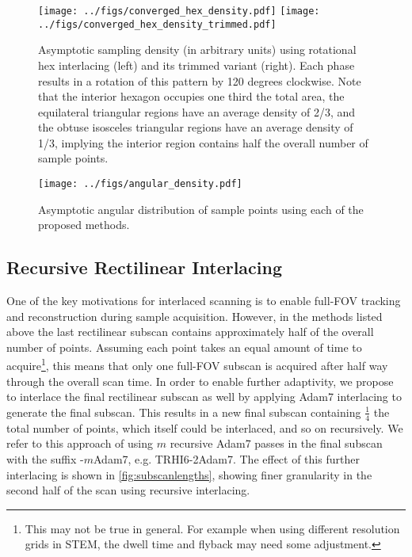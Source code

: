 \documentclass[aip, amsmath, amssymb, nobibnotes, nofootinbib, citeautoscript, reprint, superscriptaddress]{revtex4-1}
\begin{document}
    \begin{figure*}
        \centering
        \texttt{[image: ../figs/converged\_hex\_density.pdf]}
        \texttt{[image: ../figs/converged\_hex\_density\_trimmed.pdf]}
        \caption{
        \label{fig:hexdensity}
            Asymptotic sampling density (in arbitrary units) using rotational hex interlacing (left) and its trimmed variant (right).
        Each phase results in a rotation of this pattern by 120 degrees clockwise.
        Note that the interior hexagon occupies one third the total area, the equilateral triangular regions have an average density of 2/3, and the obtuse isosceles triangular regions have an average density of 1/3, implying the interior region contains half the overall number of sample points.
        }
    \end{figure*}


    \begin{figure*}
        \centering
        \texttt{[image: ../figs/angular\_density.pdf]}
        \caption{
        \label{fig:angdens} 
            Asymptotic angular distribution of sample points using each of the proposed methods.
        }
    \end{figure*}

    \subsection{Recursive Rectilinear Interlacing}
    \label{sec:recursive}

    One of the key motivations for interlaced scanning is to enable full-FOV tracking and reconstruction during sample acquisition.
    However, in the methods listed above the last rectilinear subscan contains approximately half of the overall number of points.
    Assuming each point takes an equal amount of time to acquire\footnote{This may not be true in general. For example when using different resolution grids in STEM, the dwell time and flyback may need some adjustment.}, this means that only one full-FOV subscan is acquired after half way through the overall scan time.
    In order to enable further adaptivity, we propose to interlace the final rectilinear subscan as well by applying Adam7 interlacing to generate the final subscan.
    This results in a new final subscan containing $\frac{1}{4}$ the total number of points, which itself could be interlaced, and so on recursively.
    We refer to this approach of using $m$ recursive Adam7 passes in the final subscan with the suffix -$m$Adam7, e.g. TRHI6-2Adam7.
    The effect of this further interlacing is shown in \autoref{fig:subscanlengths}, showing finer granularity in the second half of the scan using recursive interlacing.
\end{document}
